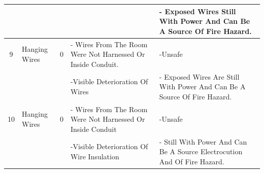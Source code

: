 \begin{table}[!htb]
{\begin{tabular}{c|p{1.5cm}|c|p{5cm}|p{5cm}}
	&  &  &  & - Exposed Wires Still With Power And Can Be A Source Of Fire Hazard. \\ 
	\hline
	9 & Hanging Wires & 0 & - Wires From The Room Were Not Harnessed Or Inside Conduit. & -Unsafe \\ 
	&  &  & -Visible Deterioration Of Wires & - Exposed Wires Are Still With Power And Can Be A Source Of Fire Hazard. \\ 
	\hline
	10 & Hanging Wires & 0 & - Wires From The Room Were Not Harnessed Or Inside Conduit & -Unsafe \\ 
	&  &  & -Visible Deterioration Of Wire Insulation & - Still With Power And Can Be A Source Electrocution And Of Fire Hazard. \\ 
	\hline
\end{tabular}

		
	}
\end{table}





